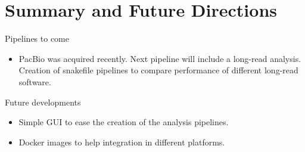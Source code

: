 \documentclass{beamer}
\begin{document}
\section{Summary and Future Directions}
\begin{frame}

\begin{block}{Pipelines to come}
\begin{itemize}
 \item PacBio was acquired recently. Next pipeline will include
 a long-read analysis. Creation of snakefile pipelines to compare performance 
 of different long-read software.
\end{itemize}
\end{block}

\begin{block}{Future developments}
 \begin{itemize}
  \item Simple GUI to ease the creation of the analysis pipelines.
  \item Docker images to help integration in different platforms.
 \end{itemize}
\end{block}
 \end{frame}
\end{document}
